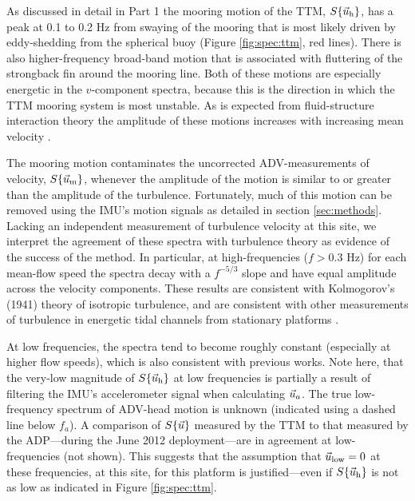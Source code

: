 As discussed in detail in Part 1 the mooring motion of the TTM, $S\{\vec{u}_\mathrm{h}\}$, has a peak at 0.1 to 0.2 Hz from swaying of the mooring that is most likely driven by eddy-shedding from the spherical buoy (Figure \ref{fig:spec:ttm}, red lines). There is also higher-frequency broad-band motion that is associated with fluttering of the strongback fin around the mooring line. Both of these motions are especially energetic in the $v$-component spectra, because this is the direction in which the TTM mooring system is most unstable. As is expected from fluid-structure interaction theory the amplitude of these motions increases with increasing mean velocity \cite[]{Morison++1950}. 

The mooring motion contaminates the uncorrected ADV-measurements of velocity, $S\{\vec{u}_\mathrm{m}\}$, whenever the amplitude of the motion is similar to or greater than the amplitude of the turbulence. Fortunately, much of this motion can be removed using the IMU's motion signals as detailed in section \ref{sec:methods}. Lacking an independent measurement of turbulence velocity at this site, we interpret the agreement of these spectra with turbulence theory as evidence of the success of the method. In particular, at high-frequencies ($f>0.3$ Hz) for each mean-flow speed the spectra decay with a $f^{-5/3}$ slope and have equal amplitude across the velocity components. These results are consistent with Kolmogorov's (1941) theory of isotropic turbulence, and are consistent with other measurements of turbulence in energetic tidal channels from stationary platforms \citep[]{Kolmogorov1941c,Walter++2011,Thomson++2012,McMillan++2016}.

At low frequencies, the spectra tend to become roughly constant (especially at higher flow speeds), which is also consistent with previous works. Note here, that the very-low magnitude of $S\{\vec{u}_\mathrm{h}\}$ at low frequencies is partially a result of filtering the IMU's accelerometer signal when calculating $\vec{u}_a$. The true low-frequency spectrum of ADV-head motion is unknown (indicated using a dashed line below $f_a$). A comparison of $S\{\vec{u}\}$ measured by the TTM to that measured by the ADP---during the June 2012 deployment---are in agreement at low-frequencies (not shown). This suggests that the assumption that $\vec{u}_\mathrm{low}=0$ at these frequencies, at this site, for this platform is justified---even if $S\{\vec{u}_\mathrm{h}\}$ is not as low as indicated in Figure \ref{fig:spec:ttm}.

